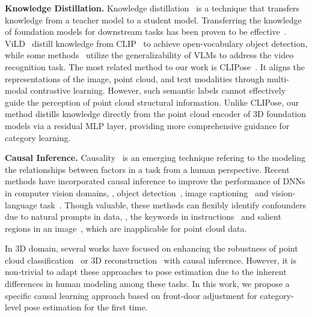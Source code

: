 \vspace{0.05cm}
\noindent
{\bf Knowledge Distillation.} Knowledge distillation~\cite{hinton2015distilling} is a technique that transfers knowledge from a teacher model to a student model. Transferring the knowledge of foundation models for downstream tasks has been proven to be effective~\cite{gu2024open,huang2024froster,zhu2024mote}. ViLD~\cite{gu2024open} distill knowledge from CLIP~\cite{radford2021learning} to achieve open-vocabulary object detection, while some methods~\cite{huang2024froster,zhu2024mote} utilize the generalizability of VLMs to address the video recognition task. 
The most related method to our work is CLIPose~\cite{lin2024clipose}. It aligns the representations of the image, point cloud, and text modalities through multi-modal contrastive learning. However, such semantic labels cannot effectively guide the perception of point cloud structural information. Unlike CLIPose, our method distills knowledge directly from the point cloud encoder of 3D foundation models via a residual MLP layer, providing more comprehensive guidance for category learning.



\vspace{0.05cm}
\noindent
{\bf Causal Inference.}
Causality~\cite{pearl2009causality} is an emerging technique refering to the modeling the relationships between factors in a task from a human perspective.
Recent methods have incorporated causal inference to improve the performance of DNNs in computer vision domains, \eg, object detection~\cite{zhang2022multiple,wang2021causal}, image captioning~\cite{yang2021deconfounded,liu2022show} and vision-language task~\cite{yang2021causal,zhang2024if,wang2024vision}.
Though valuable, these methods can flexibly identify confounders due to natural prompts in data, \eg, the keywords in instructions~\cite{wang2024vision} and salient regions in an image~\cite{wang2021causal}, which are inapplicable for point cloud data.

In 3D domain, several works have focused on enhancing the robustness of point cloud classification~\cite{huang2024causalpc} or 3D reconstruction~\cite{liu2022structural} with causal inference.
However, it is non-trivial to adapt these approaches to pose estimation due to the inherent differences in human modeling among these tasks.
In this work, we propose a specific causal learning approach based on front-door adjustment for category-level pose estimation for the first time.

